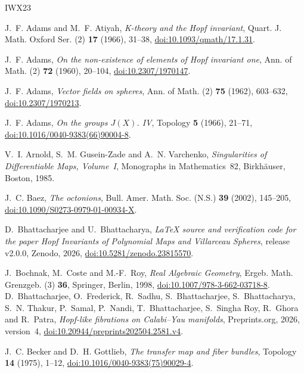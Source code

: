 \begingroup\raggedright
\begin{thebibliography}{IWX23}

 J.~F. Adams and M.~F. Atiyah, \emph{K-theory and the Hopf invariant}, Quart. J. Math. Oxford Ser. (2) \textbf{17} (1966), 31--38, \href{https://doi.org/10.1093/qmath/17.1.31}{doi:10.1093/qmath/17.1.31}.

 J.~F. Adams, \emph{On the non-existence of elements of Hopf invariant one}, Ann. of Math. (2) \textbf{72} (1960), 20--104, \href{https://doi.org/10.2307/1970147}{doi:10.2307/1970147}.

 J.~F. Adams, \emph{Vector fields on spheres}, Ann. of Math. (2) \textbf{75} (1962), 603--632, \href{https://doi.org/10.2307/1970213}{doi:10.2307/1970213}.

 J.~F. Adams, \emph{On the groups $J(X)$. IV}, Topology \textbf{5} (1966), 21--71, \href{https://doi.org/10.1016/0040-9383(66)90004-8}{doi:10.1016/0040-9383(66)90004-8}.

 V.~I. Arnold, S.~M. Gusein-Zade and A.~N. Varchenko, \emph{Singularities of Differentiable Maps, Volume~I}, Monographs in Mathematics~82, Birkh\"auser, Boston, 1985.

 J.~C. Baez, \emph{The octonions}, Bull. Amer. Math. Soc. (N.S.) \textbf{39} (2002), 145--205, \href{https://doi.org/10.1090/S0273-0979-01-00934-X}{doi:10.1090/S0273-0979-01-00934-X}.

 D.~Bhattacharjee and U.~Bhattacharya, \emph{LaTeX source and verification code for the paper Hopf Invariants of Polynomial Maps and Villarceau Spheres}, release v2.0.0, Zenodo, 2026, \href{https://doi.org/10.5281/zenodo.23815570}{doi:10.5281/zenodo.23815570}.

 J.~Bochnak, M.~Coste and M.-F.~Roy, \emph{Real Algebraic Geometry}, Ergeb. Math. Grenzgeb. (3) \textbf{36}, Springer, Berlin, 1998, \href{https://doi.org/10.1007/978-3-662-03718-8}{doi:10.1007/978-3-662-03718-8}.
 D.~Bhattacharjee, O.~Frederick, R.~Sadhu, S.~Bhattacharjee, S.~Bhattacharya, S.~N. Thakur, P.~Samal, P.~Nandi, T.~Bhattacharjee, S.~Singha Roy, R.~Ghora and R.~Patra, \emph{Hopf-like fibrations on Calabi--Yau manifolds}, Preprints.org, 2026, version~4, \href{https://doi.org/10.20944/preprints202504.2581.v4}{doi:10.20944/preprints202504.2581.v4}.

 J.~C. Becker and D.~H. Gottlieb, \emph{The transfer map and fiber bundles}, Topology \textbf{14} (1975), 1--12, \href{https://doi.org/10.1016/0040-9383(75)90029-4}{doi:10.1016/0040-9383(75)90029-4}.


\end{thebibliography}
